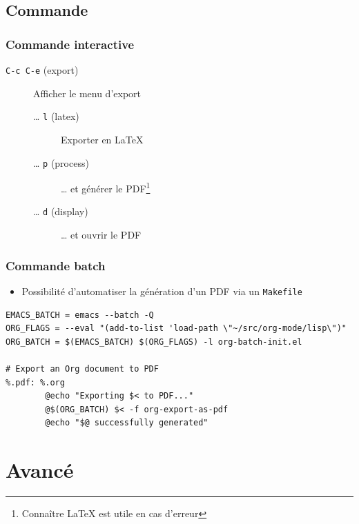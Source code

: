\documentclass[presentation,t,hideothersubsections]{beamer}
\begin{document}
\subsection{Commande}
\label{sec-4-2}
\begin{frame}
\frametitle{Commande interactive}
\label{sec-4-2-1}


\begin{description}
\item[\texttt{C-c C-e} (export)] Afficher le menu d'export
\begin{description}
\item[\ldots{} \texttt{l} (latex)] Exporter en \LaTeX{}
\item[\ldots{} \texttt{p} (process)] \ldots{} et générer le PDF\footnote{Connaître \LaTeX{} est utile en cas d'erreur
 }
\item[\ldots{} \texttt{d} (display)] \ldots{} et ouvrir le PDF
\end{description}
\end{description}
\end{frame}
\begin{frame}[fragile]
\frametitle{Commande batch}
\label{sec-4-2-2}


\begin{itemize}
\item Possibilité d'automatiser la génération d'un PDF via un \verb~Makefile~
\end{itemize}


\lstset{language=sh}
\begin{lstlisting}
EMACS_BATCH = emacs --batch -Q
ORG_FLAGS = --eval "(add-to-list 'load-path \"~/src/org-mode/lisp\")"
ORG_BATCH = $(EMACS_BATCH) $(ORG_FLAGS) -l org-batch-init.el

# Export an Org document to PDF
%.pdf: %.org
        @echo "Exporting $< to PDF..."
        @$(ORG_BATCH) $< -f org-export-as-pdf
        @echo "$@ successfully generated"
\end{lstlisting}
\end{frame}
\section{Avancé}
\label{sec-5}
\end{document}

